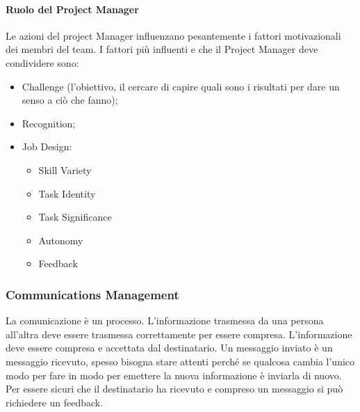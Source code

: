 \paragraph{Ruolo del Project Manager}
Le azioni del project Manager influenzano pesantemente i fattori motivazionali dei membri del team. I fattori più influenti e che il Project Manager deve condividere sono:
\begin{itemize}
	\item Challenge (l'obiettivo, il cercare di capire quali sono i risultati per dare un senso a ciò che fanno);
	\item Recognition;
	\item Job Design:
	\begin{itemize}
		\item Skill Variety
		\item Task Identity
		\item Task Significance
		\item Autonomy
		\item Feedback
	\end{itemize}
\end{itemize}
\subsubsection{Communications Management}
La comunicazione è un processo. L'informazione trasmessa da una persona all'altra deve essere trasmessa correttamente per essere compresa. L'informazione deve essere compresa e accettata dal destinatario. Un messaggio inviato è un messaggio ricevuto, spesso bisogna stare attenti perché se qualcosa cambia l'unico modo per fare in modo per emettere la nuova informazione è inviarla di nuovo.\newline
Per essere sicuri che il destinatario ha ricevuto e compreso un messaggio si può richiedere un feedback.

